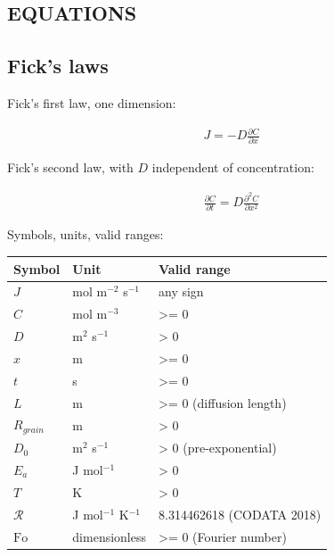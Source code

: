 \documentclass[10pt,a4paper,twoside]{report}
\begin{document}
\subsection*{EQUATIONS}

\subsection*{Fick's laws}

Fick's first law, one dimension:

\begin{equation*}
\begin{gathered}
J = -D \frac{\partial C}{\partial x}
\end{gathered}
\end{equation*}

Fick's second law, with $D$ independent of concentration:

\begin{equation*}
\begin{gathered}
\frac{\partial C}{\partial t} = D \frac{\partial^2 C}{\partial x^2}
\end{gathered}
\end{equation*}

Symbols, units, valid ranges:

\begin{center}
\footnotesize
\begin{tabular}{@{}llp{}@{}}
\toprule
Symbol & Unit & Valid range \\
\midrule
$J$ & mol m$^{-2}$ s$^{-1}$ & any sign \\
$C$ & mol m$^{-3}$ & >= 0 \\
$D$ & m$^{2}$ s$^{-1}$ & > 0 \\
$x$ & m & >= 0 \\
$t$ & s & >= 0 \\
$L$ & m & >= 0 (diffusion length) \\
$R_{grain}$ & m & > 0 \\
$D_0$ & m$^{2}$ s$^{-1}$ & > 0 (pre-exponential) \\
$E_a$ & J mol$^{-1}$ & > 0 \\
$T$ & K & > 0 \\
$\mathcal{R}$ & J mol$^{-1}$ K$^{-1}$ & 8.314462618 (CODATA 2018) \\
$\mathrm{Fo}$ & dimensionless & >= 0 (Fourier number) \\
\bottomrule
\end{tabular}
\end{center}
\end{document}
